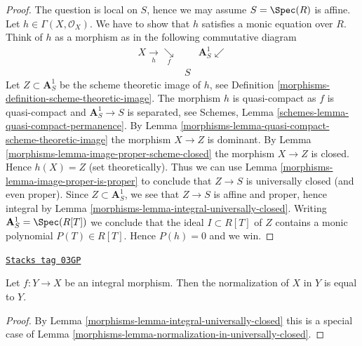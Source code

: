 \begin{proof}

The question is local on $S$, hence we may assume $S = \Spec(R)$
is affine. Let $h \in \Gamma(X, \mathcal{O}_X)$. We have to show that
$h$ satisfies a monic equation over $R$. Think of $h$ as a morphism
as in the following commutative diagram
$$
\begin{array}{ccc}X \underset{h}{\longrightarrow}\underset{f}{\searrow} &  & \mathbf{A}^1_S \swarrow \\  & S & \end{array}
$$
Let $Z \subset \mathbf{A}^1_S$ be the scheme theoretic image of $h$,
see Definition \ref{morphisms-definition-scheme-theoretic-image}.
The morphism $h$ is quasi-compact as $f$ is quasi-compact and
$\mathbf{A}^1_S \to S$ is separated, see
Schemes, Lemma \ref{schemes-lemma-quasi-compact-permanence}.
By Lemma \ref{morphisms-lemma-quasi-compact-scheme-theoretic-image} the
morphism $X \to Z$ is dominant. By
Lemma \ref{morphisms-lemma-image-proper-scheme-closed} the morphism
$X \to Z$ is closed. Hence $h(X) = Z$ (set theoretically).
Thus we can use
Lemma \ref{morphisms-lemma-image-proper-is-proper}
to conclude that $Z \to S$ is universally closed (and even proper).
Since $Z \subset \mathbf{A}^1_S$, we see that $Z \to S$ is affine
and proper, hence integral by Lemma \ref{morphisms-lemma-integral-universally-closed}.
Writing $\mathbf{A}^1_S = \Spec(R[T])$ we conclude that
the ideal $I \subset R[T]$ of $Z$ contains a monic polynomial
$P(T) \in R[T]$. Hence $P(h) = 0$ and we win.
\end{proof}

\begin{lemma}
\label{morphisms-lemma-normalization-in-integral}
\href{https://stacks.math.columbia.edu/tag/03GP}{\texttt{Stacks tag 03GP}}

Let $f : Y \to X$ be an integral morphism.
Then the normalization of $X$ in $Y$ is equal to $Y$.
\end{lemma}

\begin{proof}

By Lemma \ref{morphisms-lemma-integral-universally-closed} this is a special case of
Lemma \ref{morphisms-lemma-normalization-in-universally-closed}.
\end{proof}

